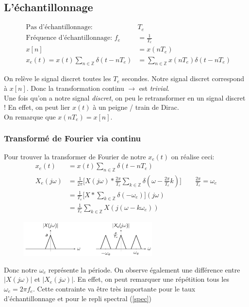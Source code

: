 \documentclass{report}
\begin{document}
\subsection{L'échantillonnage}
\begin{figure}
\centering
\begin{align*}
\text{Pas d'échantillonnage: } &T_e\\
\text{Fréquence d'échantillonnage: }  f_e &= \frac{1}{T_e}\\
x[n] &= x(nT_e)\\
x_e(t)=x(t) \sum_{n \in \mathbb{Z}} \delta(t-nT_e)&= \sum_{n \in \mathbb{Z}} x(nT_e)\delta(t-nT_e)
\end{align*}
\end{figure}
On relève le signal discret toutes les $T_e$ secondes. Notre signal discret correspond à $x[n]$. Donc la transformation continu $\rightarrow$ est \textit{trivial}.\\
Une fois qu'on a notre signal \textit{discret}, on peu le retransformer en un signal discret ! En effet, on peut lier $x(t)$ à un peigne / train de Dirac.\\
On remarque que $x(nT_e) = x[n]$.

\subsubsection{Transformé de Fourier via continu}
Pour trouver la transformer de Fourier de notre $x_e(t)$ on réalise ceci:
\begin{align*}
x_e(t)&= x(t) \sum_{n \in \mathbb{Z}} \delta(t-nT_e)\\
X_e(j\omega) &= \frac{1}{2\pi} \Bigr[ X(j\omega) \ast \frac{2\pi}{T_e} \sum_{k \in \mathbb{Z}} \delta(\omega- \frac{2\pi}{T_e}k) \Big] \qquad  \frac{2\pi}{T_e} = \omega_e\\
&= \frac{1}{T_e} \Bigr[ X \ast \sum_{k \in \mathbb{Z}} \delta(-\omega_e) \Bigr](j\omega)\\
&= \frac{1}{T_e} \sum_{k \in \mathbb{Z}} X(j(\omega -k \omega_e))
\end{align*}
\newpage
\begin{figure}
\centering
\includegraphics[width=7cm]{img/rep.png}
\end{figure}
Donc notre $\omega_e$ représente la période. On observe également une différence entre $|X(j\omega)|$ et $|X_e(j\omega)|$. En effet, on peut remarquer une répétition tous les $\omega_e = 2 \pi f_e$. Cette contrainte va être très importante pour le taux d'échantillonnage et pour le repli spectral (\ref{spec})
\end{document}
